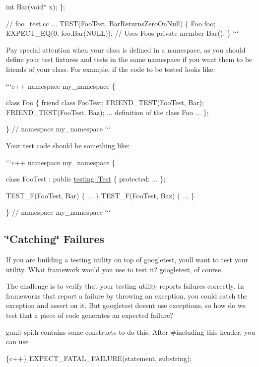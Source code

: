 \begin{DoxyItemize}
int Bar(void$\ast$ x); \};

// foo\+\_\+test.\+cc ... T\+E\+S\+T(\+Foo\+Test, Bar\+Returns\+Zero\+On\+Null) \{ Foo foo; E\+X\+P\+E\+C\+T\+\_\+\+EQ(0, foo.\+Bar(\+N\+U\+L\+L)); // Uses Foo\textquotesingle{}s private member Bar(). \} ```

Pay special attention when your class is defined in a namespace, as you should define your test fixtures and tests in the same namespace if you want them to be friends of your class. For example, if the code to be tested looks like\+:

```c++ namespace my\+\_\+namespace \{

class Foo \{ friend class Foo\+Test; F\+R\+I\+E\+N\+D\+\_\+\+T\+E\+S\+T(\+Foo\+Test, Bar); F\+R\+I\+E\+N\+D\+\_\+\+T\+E\+S\+T(\+Foo\+Test, Baz); ... definition of the class Foo ... \};

\} // namespace my\+\_\+namespace ```

Your test code should be something like\+:

```c++ namespace my\+\_\+namespace \{

class Foo\+Test \+: public \hyperlink{classtesting_1_1Test}{testing\+::\+Test} \{ protected\+: ... \};

T\+E\+S\+T\+\_\+\+F(\+Foo\+Test, Bar) \{ ... \} T\+E\+S\+T\+\_\+\+F(\+Foo\+Test, Baz) \{ ... \}

\} // namespace my\+\_\+namespace ```
\end{DoxyItemize}

\subsection*{\char`\"{}\+Catching\char`\"{} Failures}

If you are building a testing utility on top of googletest, you\textquotesingle{}ll want to test your utility. What framework would you use to test it? googletest, of course.

The challenge is to verify that your testing utility reports failures correctly. In frameworks that report a failure by throwing an exception, you could catch the exception and assert on it. But googletest doesn\textquotesingle{}t use exceptions, so how do we test that a piece of code generates an expected failure?

gunit-\/spi.\+h contains some constructs to do this. After \#including this header, you can use


\begin{DoxyCode}
\{c++\}
  EXPECT\_FATAL\_FAILURE(statement, substring);
\end{DoxyCode}


